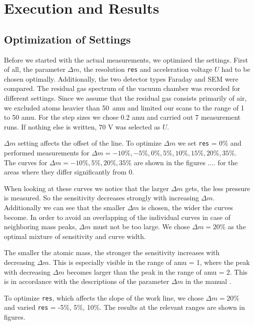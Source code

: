 \newpage
\section{Execution and Results} \label{sec:results}
    \subsection{Optimization of Settings}
    Before we started with the actual measurements, we optimized the settings.
    First of all, the parameter $\Delta m$, the resolution \texttt{res} and acceleration voltage $U$ had to be chosen optimally. Additionally, the two detector types Faraday and SEM were compared. The residual gas spectrum of the vacuum chamber was recorded for different settings. Since we assume that the residual gas consists primarily of air, we excluded atoms heavier than 50~amu and limited our scans to the range of 1 to 50 amu. For the step sizes we chose 0.2 amu and carried out 7 measurement runs. If nothing else is written, 70 V was selected as $U$.
    
    $\Delta m$ setting affects the offset of the line. To optimize $\Delta m$ we set \texttt{res} = 0\% and performed measurements for $\Delta m = -10\%, -5\%, 0\%, 5\%, 10\%, 15\%, 20\%, 35\%$.  The curves for $\Delta m = -10\%, 5\%, 20\%, 35\%$ are shown in the figures .... for the areas where they differ significantly from 0.
    
    When looking at these curves we notice that the larger $\Delta m$ gets, the less pressure is measured. So the sensitivity decreases strongly with increasing $\Delta m$. Additionally we can see
    that the smaller $\Delta m$ is chosen, the wider the curves become. In order to avoid an overlapping of the individual curves in case of neighboring mass peaks, $\Delta m$ must not be too large. We chose $\Delta m= 20\%$ as the optimal mixture of sensitivity and curve width. 
    
    The smaller the atomic mass, the stronger the sensitivity increases with decreasing $\Delta m$. This is especially visible in the range of amu = 1, where the peak with decreasing $\Delta m$ becomes larger than the peak in the range of amu = 2. This is in accordance with the descriptions of the parameter $\Delta m$ in the manual \cite{manual}. 
    
    To optimize \texttt{res}, which affects the slope of the work line, we chose $\Delta m = 20\%$ and varied \texttt{res} = -5\%, 5\%, 10\%. The results at the relevant ranges are shown in figures. 
    
